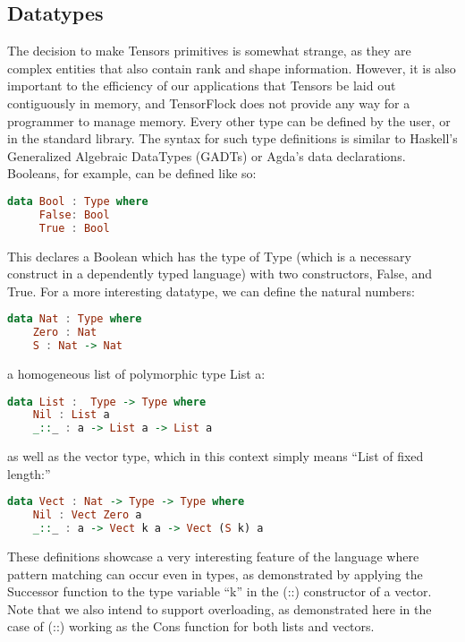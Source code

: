 \documentclass[12pt]{article}
\begin{document}
\subsection{Datatypes}
The decision to make Tensors primitives is somewhat strange, as they are complex entities that also contain rank and shape information. However, it is also important to the efficiency of our applications that Tensors be laid out contiguously in memory, and TensorFlock does not provide any way for a programmer to manage memory. 
Every other type can be defined by the user, or in the standard library. The syntax for such type definitions is similar to Haskell's Generalized Algebraic DataTypes (GADTs) or Agda's data declarations. Booleans, for example, can be defined like so:
\begin{lstlisting}[language=Haskell]
data Bool : Type where
     False: Bool
     True : Bool
\end{lstlisting}
This declares a Boolean which has the type of Type (which is a necessary construct in a dependently typed language) with two constructors, False, and True. For a more interesting datatype, we can define the natural numbers:
\begin{lstlisting}[language=Haskell]
data Nat : Type where
    Zero : Nat
    S : Nat -> Nat
\end{lstlisting}
 a homogeneous list of polymorphic type List a:
\begin{lstlisting}[language=Haskell]
data List :  Type -> Type where
    Nil : List a    
    _::_ : a -> List a -> List a
\end{lstlisting}
as well as the vector type, which in this context simply means ``List of fixed length:''
\begin{lstlisting}[language=Haskell]
data Vect : Nat -> Type -> Type where
    Nil : Vect Zero a
    _::_ : a -> Vect k a -> Vect (S k) a
\end{lstlisting}
These definitions showcase a very interesting feature of the language where pattern matching can occur even in types, as demonstrated by applying the Successor function to the type variable ``k'' in the (::) constructor of a vector. Note that we also intend to support overloading, as demonstrated here in the case of (::) working as the Cons function for both lists and vectors.
\end{document}
